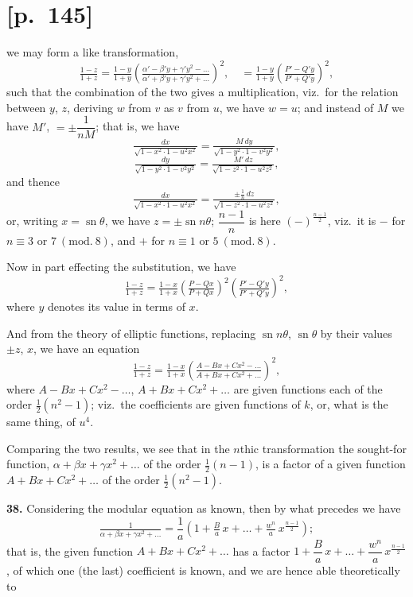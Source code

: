 \documentclass[11pt]{article}
\providecommand{\modd}{\mathrm{mod}}
\begin{document}
\section*{[p.~145]}
we may form a like transformation,
\[
\tfrac{1-z}{1+z}=\tfrac{1-y}{1+y}\!\left(\tfrac{\alpha'-\beta'y+\gamma'y^2-\ldots}{\alpha'+\beta'y+\gamma'y^2+\ldots}\right)^{\!2}\!,\quad =\tfrac{1-y}{1+y}\!\left(\tfrac{P'-Q'y}{P'+Q'y}\right)^{\!2}\!,
\]
such that the combination of the two gives a multiplication, viz.\ for the relation
between $y$, $z$, deriving $w$ from $v$ as $v$ from $u$, we have $w=u$; and instead of $M$ we
have $M'$, $=\pm\dfrac{1}{nM}$; that is, we have
\[
\tfrac{dx}{\sqrt{1-x^2\cdot 1-u^2x^2}}=\tfrac{M\,dy}{\sqrt{1-y^2\cdot 1-v^2y^2}},
\]
\[
\tfrac{dy}{\sqrt{1-y^2\cdot 1-v^2y^2}}=\tfrac{M'\,dz}{\sqrt{1-z^2\cdot 1-u^2z^2}},
\]
and thence
\[
\tfrac{dx}{\sqrt{1-x^2\cdot 1-u^2x^2}}=\tfrac{\pm\tfrac{1}{n}\,dz}{\sqrt{1-z^2\cdot 1-u^2z^2}},
\]
or, writing $x=\operatorname{sn}\theta$, we have $z=\pm\operatorname{sn}n\theta$; $\dfrac{n-1}{n}$ is here $(-)^{\frac{n-1}{2}}$, viz.\ it is $-$ for $n\equiv 3$ or
$7\ (\modd.\ 8)$, and $+$ for $n\equiv 1$ or $5\ (\modd.\ 8)$.

Now in part effecting the substitution, we have
\[
\tfrac{1-z}{1+z}=\tfrac{1-x}{1+x}\!\left(\tfrac{P-Qx}{P+Qx}\right)^{\!2}\!\left(\tfrac{P'-Q'y}{P'+Q'y}\right)^{\!2}\!,
\]
where $y$ denotes its value in terms of $x$.

And from the theory of elliptic functions, replacing $\operatorname{sn}n\theta$, $\operatorname{sn}\theta$ by their values
$\pm z$, $x$, we have an equation
\[
\tfrac{1-z}{1+z}=\tfrac{1-x}{1+x}\!\left(\tfrac{A-Bx+Cx^2-\ldots}{A+Bx+Cx^2+\ldots}\right)^{\!2}\!,
\]
where $A-Bx+Cx^2-\ldots$, $A+Bx+Cx^2+\ldots$ are given functions each of the order
$\tfrac{1}{2}(n^2-1)$; viz.\ the coefficients are given functions of $k$, or, what is the same thing, of $u^4$.

Comparing the two results, we see that in the $n$thic transformation the sought-for
function, $\alpha+\beta x+\gamma x^2+\ldots$ of the order $\tfrac{1}{2}(n-1)$, is a factor of a given function
$A+Bx+Cx^2+\ldots$ of the order $\tfrac{1}{2}(n^2-1)$.

\medskip
\noindent\textbf{38.} Considering the modular equation as known, then by what precedes we have
\[
\tfrac{1}{\alpha+\beta x+\gamma x^2+\ldots}=\frac{1}{a}\!\left(1+\tfrac{B}{a}\,x+\ldots+\tfrac{w^n}{a}\,x^{\frac{n-1}{2}}\right);
\]
that is, the given function $A+Bx+Cx^2+\ldots$ has a factor $1+\dfrac{B}{a}\,x+\ldots+\dfrac{w^n}{a}\,x^{\frac{n-1}{2}}$, of
which one (the last) coefficient is known, and we are hence able theoretically to
\end{document}
